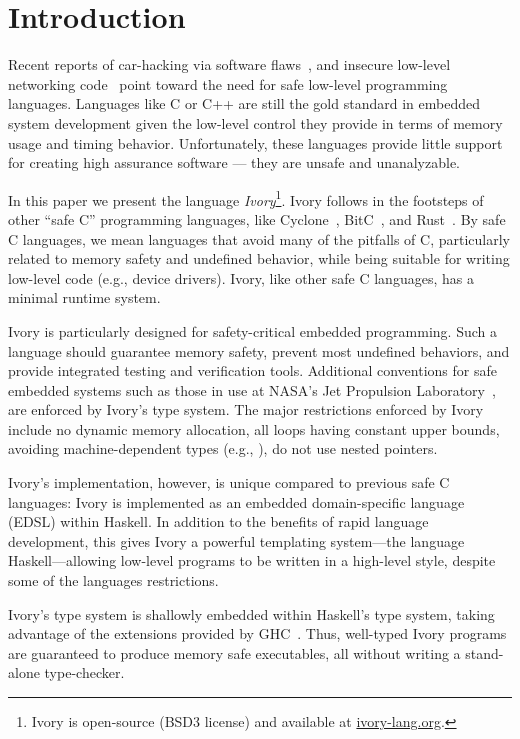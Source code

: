 \section{Introduction}
\label{sec:introduction}

Recent reports of car-hacking via software flaws~\cite{cars11}, and insecure
low-level networking code~\cite{heartbleed} point toward the need for safe low-level programming
languages. Languages like C or C++ are still the gold standard in embedded
system development given the low-level control they provide in terms of memory
usage and timing behavior. Unfortunately, these languages provide
little support for creating high assurance software --- they are
unsafe and unanalyzable.

In this paper we present the language \emph{Ivory}\footnote{%
Ivory is open-source (BSD3 license) and available at \url{ivory-lang.org}.}.
Ivory follows in the
footsteps of other ``safe C'' programming languages, like
Cyclone~\cite{cyclone}, BitC~\cite{bitc}, and Rust~\cite{rust}. By safe C
languages, we mean languages that avoid many of the pitfalls of C, particularly
related to memory safety and undefined behavior, while being suitable for
writing low-level code (e.g., device drivers). Ivory, like other safe C
languages, has a minimal runtime system.

Ivory is particularly designed for safety-critical embedded programming. Such a language
should guarantee memory safety, prevent most undefined behaviors, and provide
integrated testing and verification tools. Additional conventions for safe
embedded systems such as those in use at NASA's Jet Propulsion
Laboratory~\cite{mars}, are enforced by Ivory's type system. The major
restrictions enforced by Ivory include no dynamic memory allocation, all loops
having constant upper bounds, avoiding machine-dependent types (e.g., ),
do not use nested pointers.

Ivory's implementation, however, is unique compared to previous safe C
languages: Ivory is implemented as an embedded domain-specific language (EDSL)
within Haskell.  In addition to the benefits of rapid language development, this
gives Ivory a powerful templating system---the language Haskell---allowing
low-level programs to be written in a high-level style, despite some of the
languages restrictions.

Ivory's type system is shallowly embedded within Haskell's type
system, taking advantage of the extensions provided
by GHC~\cite{dephaskell}.  Thus, well-typed Ivory programs are
guaranteed to produce memory safe executables, all without writing a
stand-alone type-checker.


